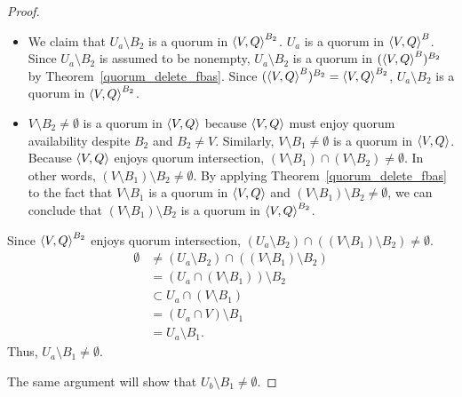 \documentclass[12pt, psamsfonts]{amsart}
\theoremstyle{definition}
\theoremstyle{remark}
\numberwithin{equation}{section}
\begin{document}
\begin{proof}
	\begin{itemize}
		\item
            We claim that $U_a \setminus B_2$ is a quorum in $\ev{V, Q}^{B_2}$.
            $U_a$ is a quorum in $\ev{V, Q}^B$.
            Since $U_a \setminus B_2$ is assumed to be nonempty, $U_a \setminus B_2$ is a quorum in $(\ev{V, Q}^B)^{B_2}$ by Theorem~\ref{quorum_delete_fbas}.
            Since $(\ev{V, Q}^B)^{B_2} = \ev{V, Q}^{B_2}$, $U_a \setminus B_2$ is a quorum in $\ev{V, Q}^{B_2}$.
		\item
            $V \setminus B_2 \ne \emptyset$ is a quorum in $\ev{V, Q}$ because $\ev{V, Q}$ must enjoy quorum availability despite $B_2$ and $B_2 \ne V$.
			Similarly, $V \setminus B_1 \ne \emptyset$ is a quorum in $\ev{V, Q}$.
			Because $\ev{V, Q}$ enjoys quorum intersection, $(V \setminus B_1) \cap (V \setminus B_2) \ne \emptyset$.
			In other words, $(V \setminus B_1) \setminus B_2 \ne \emptyset$.
            By applying Theorem~\ref{quorum_delete_fbas} to the fact that $V \setminus B_1$ is a quorum in $\ev{V, Q}$ and $(V \setminus B_1) \setminus B_2 \ne \emptyset$, we can conclude that $(V \setminus B_1) \setminus B_2$ is a quorum in $\ev{V, Q}^{B_2}$.
	\end{itemize}
	Since $\ev{V, Q}^{B_2}$ enjoys quorum intersection, $(U_a \setminus B_2) \cap ((V \setminus B_1) \setminus B_2) \ne \emptyset$.
	\begin{align*}
        \emptyset
            &\ne (U_a \setminus B_2) \cap ((V \setminus B_1) \setminus B_2) \\
            &= (U_a \cap (V \setminus B_1)) \setminus B_2 \\
            &\subset U_a \cap (V \setminus B_1) \\
            &= (U_a \cap V) \setminus B_1 \\
            &= U_a \setminus B_1.
	\end{align*}
	Thus, $U_a \setminus B_1 \ne \emptyset$.

	The same argument will show that $U_b \setminus B_1 \ne \emptyset$.
\end{proof}
\end{document}
